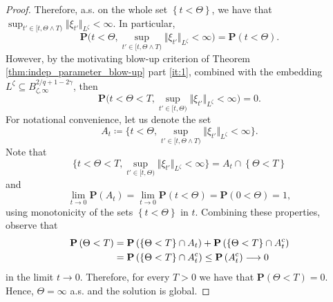 \documentclass[11pt, a4paper,oneside, reqno]{amsart}
\theoremstyle{remark} %
\theoremstyle{definition} %
\numberwithin{theorem}{section}
\numberwithin{equation}{section}
\newcommand{\norm}[1]{\Vert #1 \Vert}
\newcommand{\gam}{\gamma}
\begin{document}
\begin{proof}
Therefore, a.s. on the whole set $\left\{t < \Theta\right\}$, we have that $\sup_{t' \in [t,\Theta \wedge T)} \norm{\xi_{t'}}_{L^{\zeta}} < \infty$. In particular,
$$\mathbf{P}\big(t < \Theta, \sup_{t' \in [t,\Theta \wedge T)} \norm{\xi_{t'}}_{L^{\zeta}} < \infty  \big) = \mathbf{P}\left(t < \Theta\right).$$
However, by the motivating blow-up criterion of Theorem \ref{thm:indep_parameter_blow-up} part \ref{it:1}, combined with the embedding $L^\zeta \subseteq B^{2/q+1-2\gam}_{\zeta,\infty}$, then
$$\mathbf{P}\big(t < \Theta < T, \sup_{t' \in [t,\Theta)} \norm{\xi_{t'}}_{L^{\zeta}} < \infty  \big) = 0.$$
For notational convenience, let us denote the set
$$A_t \coloneqq \big\{t < \Theta, \sup_{t' \in [t,\Theta \wedge T)} \norm{\xi_{t'}}_{L^{\zeta}} < \infty \big\}.$$
Note that
$$\big\{t < \Theta < T, \sup_{t' \in [t,\Theta)} \norm{\xi_{t'}}_{L^{\zeta}} < \infty  \big\} = A_t \cap \left\{ \Theta < T \right\}$$
and
$$\lim_{t \rightarrow 0} \mathbf{P}(A_t) = \lim_{t \rightarrow 0}\mathbf{P}\left(t < \Theta \right) = \mathbf{P}(0 < \Theta) = 1,$$
using monotonicity of the sets $\left\{t < \Theta \right\}$ in $t$. Combining these properties, observe that
\begin{align} \nonumber
    \mathbf{P}\left(\Theta < T\right) &= \mathbf{P}\left(\left\{\Theta < T \right\} \cap A_t \right) + \mathbf{P}\left(\left\{\Theta < T \right\} \cap A_t^{\rm c} \right)\\ &= \mathbf{P}\left(\left\{\Theta < T \right\} \cap A_t^{\rm c} \right)
    \leq \mathbf{P}\left( A_t^{\rm c} \right)
    \longrightarrow 0 \label{identically}
\end{align}
in the limit $t \rightarrow 0$. Therefore, for every $T>0$ we have that $\mathbf{P}\left(\Theta < T \right) = 0$. Hence, $\Theta = \infty$ a.s. and the solution is global.
\end{proof}
\end{document}
